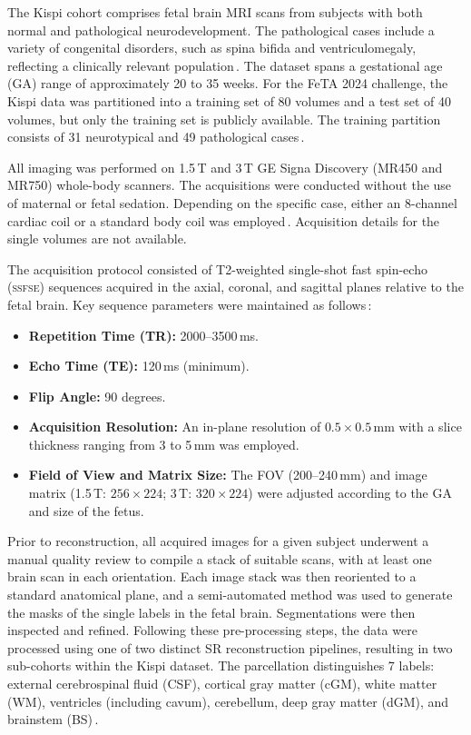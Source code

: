 The Kispi cohort comprises fetal brain MRI scans from subjects with both normal and pathological neurodevelopment. The pathological cases include a variety of congenital disorders, such as spina bifida and ventriculomegaly, reflecting a clinically relevant population\,\cite{FeTA2024_paper, Ciceri2024}. The dataset spans a gestational age (GA) range of approximately 20 to 35 weeks. For the FeTA 2024 challenge, the Kispi data was partitioned into a training set of 80 volumes and a test set of 40 volumes, but only the training set is publicly available. The training partition consists of 31 neurotypical and 49 pathological cases\,\cite{FeTA2024_review}.

All imaging was performed on 1.5\,T and 3\,T GE Signa Discovery (MR450 and MR750) whole-body scanners. The acquisitions were conducted without the use of maternal or fetal sedation. Depending on the specific case, either an 8-channel cardiac coil or a standard body coil was employed\,\cite{FeTA2024_paper}. Acquisition details for the single volumes are not available.

The acquisition protocol consisted of T2-weighted single-shot fast spin-echo (\textsc{ssfse}) sequences acquired in the axial, coronal, and sagittal planes relative to the fetal brain. Key sequence parameters were maintained as follows\,\cite{FeTA2024_paper}:
\begin{itemize}
    \item \textbf{Repetition Time (TR):} 2000--3500\,ms.
    \item \textbf{Echo Time (TE):} 120\,ms (minimum).
    \item \textbf{Flip Angle:} 90 degrees.
    \item \textbf{Acquisition Resolution:} An in-plane resolution of $0.5 \times 0.5$\,mm with a slice thickness ranging from 3 to 5\,mm was employed.
    \item \textbf{Field of View and Matrix Size:} The FOV (200--240\,mm) and image matrix (1.5\,T: $256 \times 224$; 3\,T: $320 \times 224$) were adjusted according to the GA and size of the fetus.
\end{itemize}

Prior to reconstruction, all acquired images for a given subject underwent a manual quality review to compile a stack of suitable scans, with at least one brain scan in each orientation. Each image stack was then reoriented to a standard anatomical plane, and a semi-automated method was used to generate the masks of the single labels in the fetal brain. Segmentations were then inspected and refined. Following these pre-processing steps, the data were processed using one of two distinct SR reconstruction pipelines, resulting in two sub-cohorts within the Kispi dataset. The parcellation distinguishes 7 labels: external cerebrospinal fluid (CSF), cortical gray matter (cGM), white matter (WM), ventricles (including cavum), cerebellum, deep gray matter (dGM), and brainstem (BS)\,\cite{FeTA2024_paper}.

